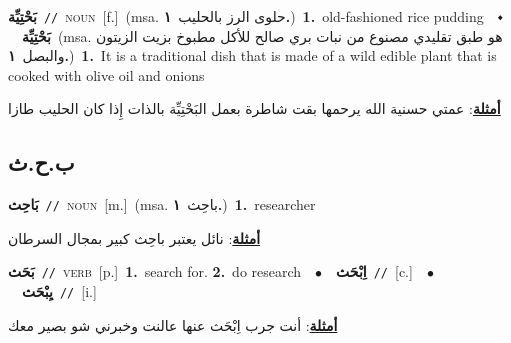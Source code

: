 \documentclass[10pt,a4paper,twoside]{article} %
\begin{document}
\begin{multicols}{2}
{\setlength\topsep{0pt}\textbf{\foreignlanguage{arabic}{بَحْتِيِّة}}\ {\color{gray}\texttt{//}\color{black}}\ \textsc{noun}\ [f.]\ \color{gray}(msa. \foreignlanguage{arabic}{حلوى الرز بالحليب}~\foreignlanguage{arabic}{\textbf{١.}})\color{black}\ \textbf{1.}~old-fashioned rice pudding\ \ $\smblkdiamond$\ \ \setlength\topsep{0pt}\textbf{\foreignlanguage{arabic}{بَحْتِيِّة}}\ \color{gray}(msa. \foreignlanguage{arabic}{هو طبق تقليدي مصنوع من نبات بري صالح للأكل مطبوخ بزيت الزيتون والبصل}~\foreignlanguage{arabic}{\textbf{١.}})\color{black}\ \textbf{1.}~It is a traditional dish that is made of a wild edible plant that is cooked with olive oil and onions\  \begin{flushright}\color{gray}\foreignlanguage{arabic}{\textbf{\underline{\foreignlanguage{arabic}{أمثلة}}}: عمتي حسنية الله يرحمها بقت شاطرة بعمل البَحْتِيِّة بالذات إِذا كان الحليب طازا}\end{flushright}\color{black}} \vspace{2mm}

\vspace{-3mm}
\subsection*{\color{blue}\foreignlanguage{arabic}{ب.ح.ث}\color{blue}{}} 

{\setlength\topsep{0pt}\textbf{\foreignlanguage{arabic}{بَاحِث}}\ {\color{gray}\texttt{//}\color{black}}\ \textsc{noun}\ [m.]\ \color{gray}(msa. \foreignlanguage{arabic}{باحِث}~\foreignlanguage{arabic}{\textbf{١.}})\color{black}\ \textbf{1.}~researcher\  \begin{flushright}\color{gray}\foreignlanguage{arabic}{\textbf{\underline{\foreignlanguage{arabic}{أمثلة}}}: نائل يعتبر باحِث كبير بمجال السرطان}\end{flushright}\color{black}} \vspace{2mm}

{\setlength\topsep{0pt}\textbf{\foreignlanguage{arabic}{بَحَث}}\ {\color{gray}\texttt{//}\color{black}}\ \textsc{verb}\ [p.]\ \textbf{1.}~search for.  \textbf{2.}~do research\ \ $\bullet$\ \ \setlength\topsep{0pt}\textbf{\foreignlanguage{arabic}{اِبْحَث}}\ {\color{gray}\texttt{//}\color{black}}\ [c.]\ \ $\bullet$\ \ \setlength\topsep{0pt}\textbf{\foreignlanguage{arabic}{يِبْحَث}}\ {\color{gray}\texttt{//}\color{black}}\ [i.]\  \begin{flushright}\color{gray}\foreignlanguage{arabic}{\textbf{\underline{\foreignlanguage{arabic}{أمثلة}}}: أنت جرب اِبْحَث عنها عالنت وخبرني شو بصير معك}\end{flushright}\color{black}} \vspace{2mm}


\end{multicols}
\end{document}
